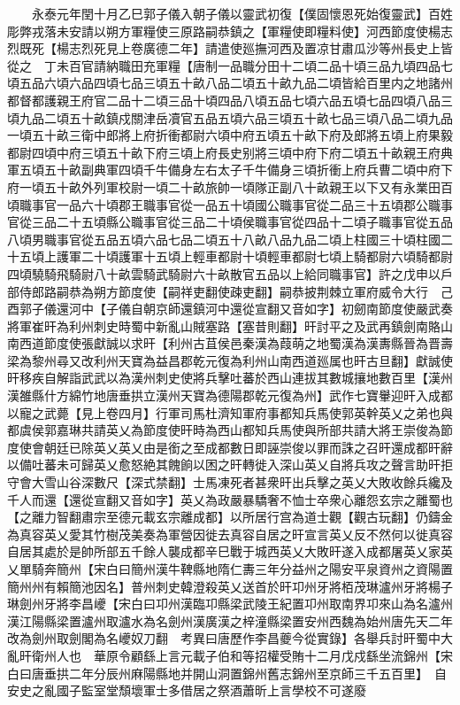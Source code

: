 　　永泰元年閏十月乙巳郭子儀入朝子儀以靈武初復【僕固懷恩死始復靈武】百姓彫弊戎落未安請以朔方軍糧使三原路嗣恭鎮之【軍糧使即糧料使】河西節度使楊志烈既死【楊志烈死見上卷廣德二年】請遣使廵撫河西及置凉甘肅瓜沙等州長史上皆從之　丁未百官請納職田充軍糧【唐制一品職分田十二頃二品十頃三品九頃四品七頃五品六頃六品四頃七品三頃五十畝八品二頃五十畝九品二頃皆給百里内之地諸州都督都護親王府官二品十二頃三品十頃四品八頃五品七頃六品五頃七品四頃八品三頃九品二頃五十畝鎮戍關津岳凟官五品五頃六品三頃五十畝七品三頃八品二頃九品一頃五十畝三衛中郎將上府折衝都尉六頃中府五頃五十畝下府及郎將五頃上府果毅都尉四頃中府三頃五十畝下府三頃上府長史别將三頃中府下府二頃五十畝親王府典軍五頃五十畝副典軍四頃千牛備身左右太子千牛備身三頃折衝上府兵曹二頃中府下府一頃五十畝外列軍校尉一頃二十畝旅帥一頃隊正副八十畝親王以下又有永業田百頃職事官一品六十頃郡王職事官從一品五十頃國公職事官從二品三十五頃郡公職事官從三品二十五頃縣公職事官從三品二十頃侯職事官從四品十二頃子職事官從五品八頃男職事官從五品五頃六品七品二頃五十八畝八品九品二頃上柱國三十頃柱國二十五頃上護軍二十頃護軍十五頃上輕車都尉十頃輕車都尉七頃上騎都尉六頃騎都尉四頃驍騎飛騎尉八十畝雲騎武騎尉六十畝散官五品以上給同職事官】許之戊申以戶部侍郎路嗣恭為朔方節度使【嗣祥吏翻使疎吏翻】嗣恭披荆棘立軍府威令大行　己酉郭子儀還河中【子儀自朝京師還鎮河中還從宣翻又音如字】初劒南節度使嚴武奏將軍崔旰為利州刺史時蜀中新亂山賊塞路【塞昔則翻】旰討平之及武再鎮劍南賂山南西道節度使張獻誠以求旰【利州古苴侯邑秦漢為葭萌之地蜀漢為漢夀縣晉為晋壽梁為黎州尋又改利州天寶為益昌郡乾元復為利州山南西道廵属也旰古旦翻】獻誠使旰移疾自解詣武武以為漢州刺史使將兵擊吐蕃於西山連拔其數城攘地數百里【漢州漢雒縣什方綿竹地唐垂拱立漢州天寶為德陽郡乾元復為州】武作七寶轝迎旰入成都以寵之武薨【見上卷四月】行軍司馬杜濟知軍府事都知兵馬使郭英幹英乂之弟也與都虞侯郭嘉琳共請英乂為節度使旰時為西山都知兵馬使與所部共請大將王崇俊為節度使會朝廷已除英乂英乂由是銜之至成都數日即誣崇俊以罪而誅之召旰還成都旰辭以備吐蕃未可歸英乂愈怒絶其餽餉以困之旰轉徙入深山英乂自將兵攻之聲言助旰拒守會大雪山谷深數尺【深式禁翻】士馬凍死者甚衆旰出兵擊之英乂大敗收餘兵纔及千人而還【還從宣翻又音如字】英乂為政嚴暴驕奢不恤士卒衆心離怨玄宗之離蜀也【之離力智翻肅宗至德元載玄宗離成都】以所居行宫為道士觀【觀古玩翻】仍鑄金為真容英乂愛其竹樹茂美奏為軍營因徙去真容自居之旰宣言英乂反不然何以徙真容自居其處於是帥所部五千餘人襲成都辛巳戰于城西英乂大敗旰遂入成都屠英乂家英乂單騎奔簡州【宋白曰簡州漢牛鞞縣地隋仁夀三年分益州之陽安平泉資州之資陽置簡州州有賴簡池因名】普州刺史韓澄殺英乂送首於旰卭州牙將栢茂琳瀘州牙將楊子琳劍州牙將李昌巙【宋白曰卭州漢臨卭縣梁武陵王紀置卭州取南界卭來山為名瀘州漢江陽縣梁置瀘州取瀘水為名劍州漢廣漢之梓潼縣梁置安州西魏為始州唐先天二年改為劍州取劍閣為名巙奴刀翻　考異曰唐歷作李昌夔今從實錄】各舉兵討旰蜀中大亂旰衛州人也　華原令顧繇上言元載子伯和等招權受賄十二月戊戍繇坐流錦州【宋白曰唐垂拱二年分辰州麻陽縣地并開山洞置錦州舊志錦州至京師三千五百里】　自安史之亂國子監室堂頹壞軍士多借居之祭酒蕭昕上言學校不可遂廢

